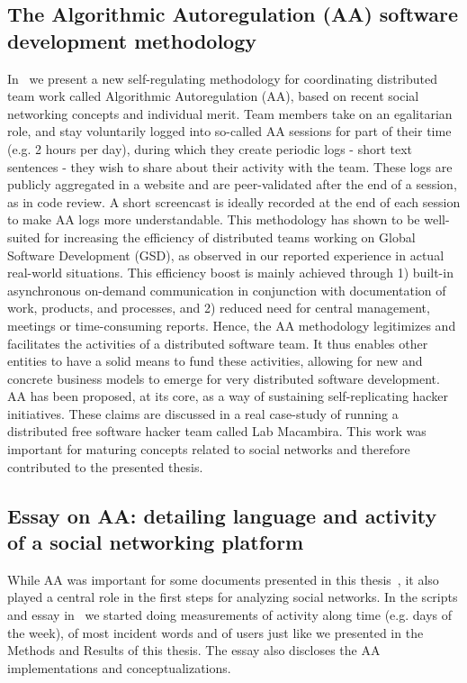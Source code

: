 \begin{apendicesenv}
\section{The Algorithmic Autoregulation (AA) software development methodology}\label{sec:aa}
In~\cite{aaPaper} we present a new self-regulating methodology for coordinating distributed team work called Algorithmic Autoregulation (AA),
based on recent social networking concepts and individual merit.
Team members take on an egalitarian role, and stay voluntarily logged into so-called AA sessions for part of their time 
(e.g. 2 hours per day), during which they create periodic logs - short text sentences - 
they wish to share about their activity with the team.
These logs are publicly aggregated in a website and are peer-validated after the end of a session,
as in code review. 
A short screencast is ideally recorded at the end of each session to make AA logs more understandable.
This methodology has shown to be well-suited for increasing the efficiency of distributed teams working on 
Global Software Development (GSD), as observed in our reported experience in actual real-world situations.
This efficiency boost is mainly achieved through 1) built-in asynchronous on-demand communication in 
conjunction with documentation of work, products, and processes, and 2) reduced need for central management,
meetings or time-consuming reports.
Hence, the AA methodology legitimizes and facilitates the activities of a distributed software team.
It thus enables other entities to have a solid means to fund these activities, 
allowing for new and concrete business models to emerge for very distributed software development. 
AA has been proposed, at its core, as a way of sustaining self-replicating hacker initiatives.
These claims are discussed in a real case-study of running a distributed free software hacker team called Lab Macambira.
This work was important for maturing concepts related to social networks and therefore contributed to the presented thesis.

\subsection{Essay on AA: detailing language and activity of a social networking platform}
While AA was important for some documents presented in this thesis~\cite{aaPaper,losd},
it also played a central role in the first steps for analyzing social networks.
In the scripts and essay in~\cite{ensaaio} we started doing measurements of activity along time (e.g. days of the week),
of most incident words and of users just like we presented in the Methods and Results of this thesis.
The essay also discloses the AA implementations and conceptualizations.


\end{apendicesenv}
